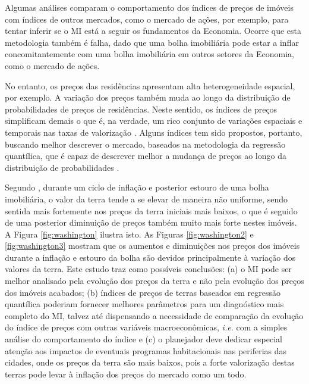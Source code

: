 \documentclass[
	12pt,				%
	oneside,			%
	a4paper,			%
	chapter=TITLE,		%
	section=TITLE,		%
	english,			%
	brazil				%
	]{abntex2}
\begin{document}
\begin{refsection}
Algumas análises comparam o comportamento dos índices de preços de imóveis com
índices de outros mercados, como o mercado de ações, por exemplo, para tentar
inferir se o \gls{MI} está a seguir os fundamentos da Economia. Ocorre que esta
metodologia também é falha, dado que uma bolha imobiliária pode estar a inflar
concomitantemente com uma bolha imobiliária em outros setores da Economia, como
o mercado de ações.

No entanto, os preços das residências apresentam alta heterogeneidade espacial,
por exemplo. A variação dos preços também muda ao longo da distribuição de
probabilidades de preços de residências. Neste sentido, os índices de preços
simplificam demais o que é, na verdade, um rico conjunto de variações espaciais
e temporais nas taxas de valorização \autocite{McMillen2014LocalQH}. Alguns índices tem
sido propostos, portanto, buscando melhor descrever o mercado, baseados na
metodologia da regressão quantílica, que é capaz de descrever melhor a mudança
de preços ao longo da distribuição de probabilidades \autocites[ver][]{Wen,ZHANG201785,Coulson}.

Segundo \textcite[pp.~16-17]{washington}, durante um ciclo de inflação e posterior
estouro de uma bolha imobiliária, o valor da terra tende a
se elevar de maneira não uniforme, sendo sentida mais fortemente nos preços da
terra iniciais mais baixos, o que é seguido de uma posterior diminuição de
preços também muito mais forte nestes imóveis. A Figura \ref{fig:washington}
ilustra isto. As Figuras \ref{fig:washington2} e \ref{fig:washington3} mostram
que os aumentos e diminuições nos preços dos imóveis durante a inflação e
estouro da bolha são devidos principalmente à variação dos valores da terra.
Este estudo traz como possíveis conclusões: (a) o \gls{MI} pode ser melhor
analisado pela evolução dos preços da terra e não pela evolução dos preços dos
imóveis acabados; (b) índices de preços de terras baseados em regressão
quantílica poderiam fornecer melhores parâmetros para um diagnóstico mais
completo do \gls{MI}, talvez até dispensando a necessidade de comparação da
evolução do índice de preços com outras variáveis macroeconômicas, \emph{i.e.} com a
simples análise do comportamento do índice e (c) o planejador deve dedicar
especial atenção aos impactos de eventuais programas habitacionais nas
periferias das cidades, onde os preços da terra são mais baixos, pois a forte
valorização destas terras pode levar à inflação dos preços do mercado como um
todo.
\begin{figure}[H]


\end{figure}
\end{refsection}
\end{document}

